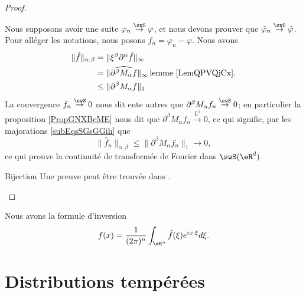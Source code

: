 \begin{proof}
\begin{subproof}
            Nous supposons avoir une suite \( \varphi_n\stackrel{\swS}{\to}\varphi\), et nous devons prouver que \( \hat\varphi_n\stackrel{\swS}{\to}\hat\varphi\). Pour alléger les notations, nous posons \( f_n=\varphi_n-\varphi\). Nous avons
            \begin{subequations}    \label{subEqsSGsGGih}
                \begin{align}
                    \| \hat f \|_{\alpha,\beta}&=\| \xi^{\beta}\partial^{\alpha}\hat f \|_{\infty}\\
                    &=\| \widehat{  \partial^{\beta}M_{\alpha}f  } \|_{\infty}\,\text{lemme \ref{LemQPVQjCx}.}\\
                    &\leq \| \partial^{\beta}M_{\alpha}f \|_1
                \end{align}
            \end{subequations}
            La convergence \(f_n\stackrel{\swS}{\to}0\) nous dit ente autres que \( \partial^{\beta}M_{\alpha}f_n\stackrel{\swS}{\to}0\); en particulier la proposition \ref{PropGNXBeME} nous dit que \( \partial^{\beta}M_{\alpha}f_n\stackrel{L^1}{\to}0\), ce qui signifie, par les majorations \eqref{subEqsSGsGGih} que
            \begin{equation}
                \| \hat f_n \|_{\alpha,\beta}\leq \| \partial^{\beta}M_{\alpha}f_n \|_1\to0,
            \end{equation}
            ce qui prouve la continuité de transformée de Fourier dans \( \swS(\eR^d)\).
        \item[Bijection]
            Une preuve peut être trouvée dans \cite{BMoNzTY}.
    \end{subproof}
\end{proof}

\begin{theorem}
    Nous avons la formule d'inversion
    \begin{equation}
        f(x)=\frac{1}{ (2\pi)^n }\int_{\eR^n}\hat f(\xi) e^{ix\cdot \xi}d\xi.
    \end{equation}
\end{theorem}


\section{Distributions tempérées}

